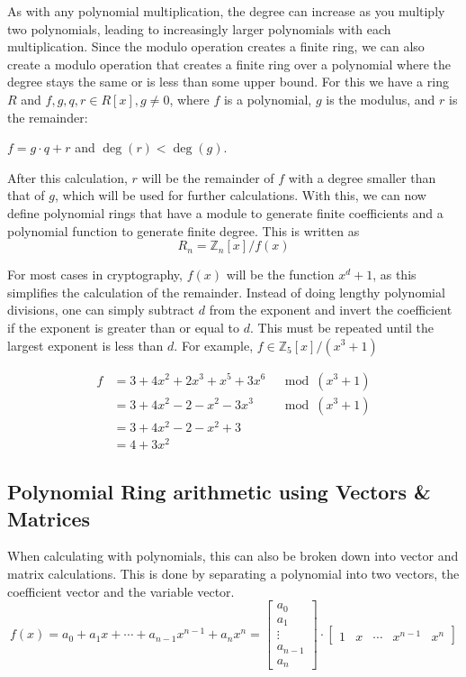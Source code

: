 As with any polynomial multiplication, the degree can increase as you multiply two polynomials, leading to increasingly larger polynomials with each multiplication. Since the modulo operation creates a finite ring, we can also create a modulo operation that creates a finite ring over a polynomial where the degree stays the same or is less than some upper bound. For this we have a ring $R$ and $f, g, q, r \in R[x], g\neq 0$, where $f$ is a polynomial, $g$ is the modulus, and $r$ is the remainder:
\begin{center}
  $f = g\cdot q + r $ and $\deg(r)<\deg(g)$.
\end{center}

After this calculation, $r$ will be the remainder of $f$ with a degree smaller than that of $g$, which will be used for further calculations. With this, we can now define polynomial rings that have a module to generate finite coefficients and a polynomial function to generate finite degree. This is written as 
$$R_n = \mathbb{Z}_n[x]/f(x)$$

For most cases in cryptography, $f(x)$ will be the function $x^d+1$, as this simplifies the calculation of the remainder. Instead of doing lengthy polynomial divisions, one can simply subtract $d$ from the exponent and invert the coefficient if the exponent is greater than or equal to $d$. This must be repeated until the largest exponent is less than $d$. For example, $f \in \mathbb{Z}_5[x]/(x^3+1)$

\begin{align*}
  f & = 3+4x^2+2x^3+x^5+3x^6 & \mod (x^3+1) \\
    & = 3+4x^2-2-x^2-3x^3    & \mod (x^3+1) \\
    & = 3+4x^2-2-x^2+3                      \\
    & = 4+3x^2
\end{align*}

\subsection*{Polynomial Ring arithmetic using Vectors \& Matrices}
\label{sec:PolyMulMath}

When calculating with polynomials, this can also be broken down into vector and matrix calculations. This is done by separating a polynomial into two vectors, the coefficient vector and the variable vector.
$$
  f(x) = a_0+ a_1x+\cdots+ a_{n-1}x^{n-1}+a_nx^n =
  \begin{bmatrix}a_0\\a_1\\ \vdots \\a_{n-1}\\a_n \end{bmatrix}
  \cdot
  \begin{bmatrix}1 & x & \cdots & x^{n-1} &  x^n \end{bmatrix}
$$

